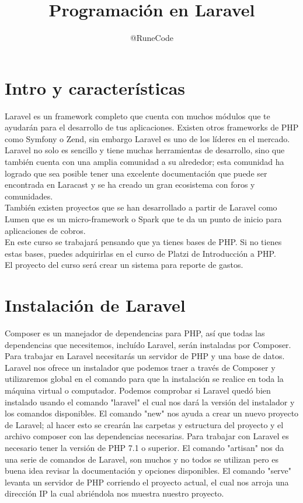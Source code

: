 \documentclass{article}
\title{Programación en Laravel}
\author{@RuneCode}
\begin{document}


\section{Intro y características}%
Laravel es un framework completo que cuenta con muchos módulos que te ayudarán
para el desarrollo de tus aplicaciones. Existen otros frameworks de PHP como
Symfony o Zend, sin embargo Laravel es uno de los líderes en el mercado.\\

Laravel no solo es sencillo y tiene muchas herramientas de desarrollo, sino que
también cuenta con una amplia comunidad a su alrededor; esta comunidad ha
logrado que sea posible tener una excelente documentación que puede ser
encontrada en Laracast y se ha creado un gran ecosistema con foros y
comunidades.\\
También existen proyectos que se han desarrollado a partir de Laravel como
Lumen que es un micro-framework o Spark que te da un punto de inicio para
aplicaciones de cobros.\\

En este curso se trabajará pensando que ya tienes bases de PHP. Si no tienes
estas bases, puedes adquirirlas en el curso de Platzi de Introducción a PHP.\\
El proyecto del curso será crear un sistema para reporte de gastos.\\

\section{Instalación de Laravel}%
Composer es un manejador de dependencias para PHP, así que todas las
dependencias que necesitemos, incluído Laravel, serán instaladas por
Composer.
Para trabajar en Laravel necesitarás un servidor de PHP y una base de datos.\\
Laravel nos ofrece un instalador que podemos traer a través de Composer y
utilizaremos global en el comando para que la instalación se realice en toda la
máquina virtual o computador.
Podemos comprobar si Laravel quedó bien instalado usando el comando "laravel"
el cual nos dará la versión del instalador y los comandos disponibles.
El comando "new" nos ayuda a crear un nuevo proyecto de Laravel; al hacer esto
se crearán las carpetas y estructura del proyecto y el archivo composer con las
dependencias necesarias.
Para trabajar con Laravel es necesario tener la versión de PHP 7.1 o
superior.
El comando "artisan" nos da una serie de comandos de Laravel, son muchos y no
todos se utilizan pero es buena idea revisar la documentación y opciones
disponibles.
El comando "serve" levanta un servidor de PHP corriendo el proyecto actual, el
cual nos arroja una dirección IP la cual abriéndola nos muestra nuestro
proyecto.\\
\end{document}
